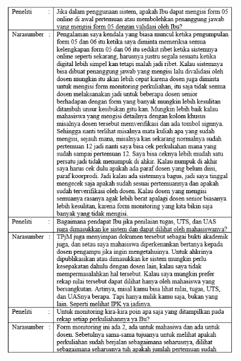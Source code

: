 \begin{figure}[H]
	\centering
	\includegraphics[width=0.9\textwidth]{gambar/lampiran/UR-4}	
\end{figure}


